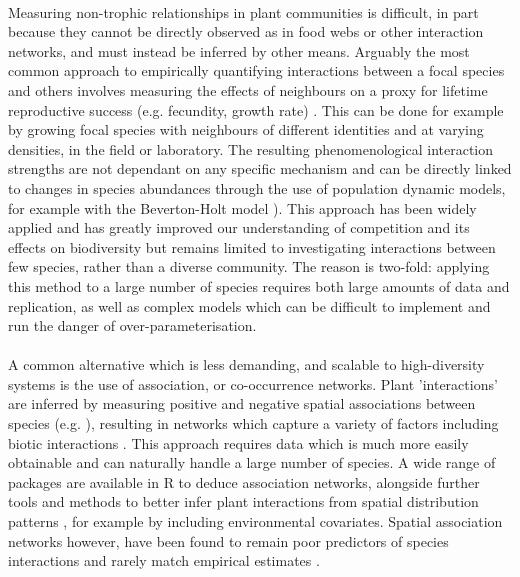 \documentclass[a4,12pt]{article}
\begin{document}
    \paragraph{}
    Measuring non-trophic relationships in plant communities is difficult, in part because they cannot be directly observed as in food webs or other interaction networks, and must instead be inferred by other means. Arguably the most common approach to empirically quantifying interactions between a focal species and others involves measuring the effects of neighbours on a proxy for lifetime reproductive success (e.g. fecundity, growth rate) \parencite{Connell1961, Grace1990}. This can be done for example by growing focal species with neighbours of different identities and at varying densities, in the field or laboratory. The resulting phenomenological interaction strengths are not dependant on any specific mechanism and can be directly linked to changes in species abundances through the use of population dynamic models, for example with the Beverton-Holt model \parencite{Beverton1957, Levine2009}). This approach has been widely applied and has greatly improved our understanding of competition and its effects on biodiversity \parencite{Tilman1982, Chesson2000b, Levine2008, Adler2010, Mayfield2010a, Kraft2015} but remains limited to investigating interactions between few species, rather than a diverse community. The reason is two-fold: applying this method to a large number of species requires both large amounts of data and replication, as well as complex models which can be difficult to implement and run the danger of over-parameterisation. 

    \paragraph{} 
    A common alternative which is less demanding, and scalable to high-diversity systems is the use of association, or co-occurrence networks. Plant 'interactions' are inferred by measuring positive and negative spatial associations between species (e.g. \cite{Saiz2011}), resulting in networks which capture a variety of factors including biotic interactions \parencite{Losapio2019}. This approach requires data which is much more easily obtainable and can naturally handle a large number of species. A wide range of packages are available in R to deduce association networks, alongside further tools and methods to better infer plant interactions from spatial distribution patterns \parencite{Keil2019}, for example by including environmental covariates. Spatial association networks however, have been found to remain poor predictors of species interactions and rarely match empirical estimates \parencite{Sander2017,Barner2018, Thurman2019, Blanchet2020}.
\end{document}
